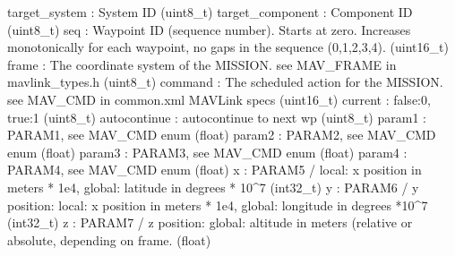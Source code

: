 \begin{DoxyVerb}
\begin{DoxyVerb}
\begin{DoxyVerb}
\begin{DoxyVerb}
\begin{DoxyVerb}
target_system             : System ID (uint8_t)
target_component          : Component ID (uint8_t)
seq                       : Waypoint ID (sequence number). Starts at zero. Increases monotonically for each waypoint, no gaps in the sequence (0,1,2,3,4). (uint16_t)
frame                     : The coordinate system of the MISSION. see MAV_FRAME in mavlink_types.h (uint8_t)
command                   : The scheduled action for the MISSION. see MAV_CMD in common.xml MAVLink specs (uint16_t)
current                   : false:0, true:1 (uint8_t)
autocontinue              : autocontinue to next wp (uint8_t)
param1                    : PARAM1, see MAV_CMD enum (float)
param2                    : PARAM2, see MAV_CMD enum (float)
param3                    : PARAM3, see MAV_CMD enum (float)
param4                    : PARAM4, see MAV_CMD enum (float)
x                         : PARAM5 / local: x position in meters * 1e4, global: latitude in degrees * 10^7 (int32_t)
y                         : PARAM6 / y position: local: x position in meters * 1e4, global: longitude in degrees *10^7 (int32_t)
z                         : PARAM7 / z position: global: altitude in meters (relative or absolute, depending on frame. (float)\end{DoxyVerb}
 \mbox{\label{classpymavlink_1_1dialects_1_1v10_1_1MAVLink_ac7cc730d070cee5caa270855d48275a8}} 

\end{DoxyVerb}
\end{DoxyVerb}
\end{DoxyVerb}
\end{DoxyVerb}
